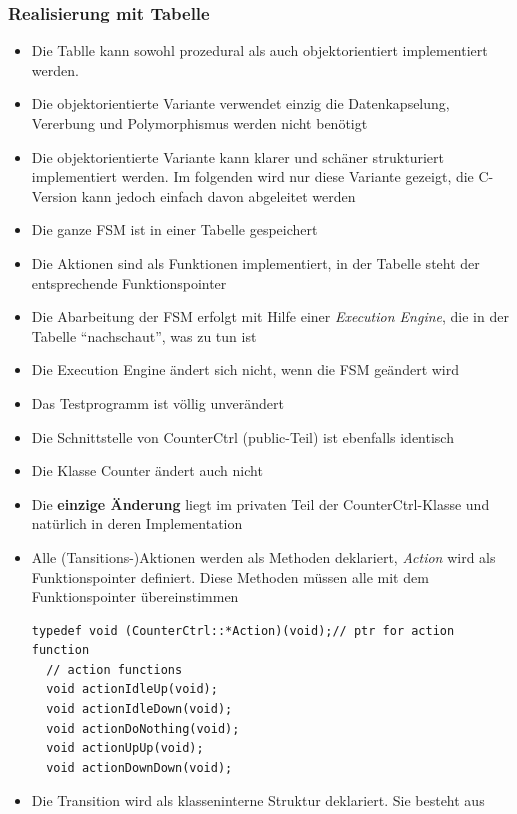 \subsubsection{Realisierung mit Tabelle}
\begin{itemize}
  \item Die Tablle kann sowohl prozedural als auch objektorientiert implementiert werden.
  \item Die objektorientierte Variante verwendet einzig die Datenkapselung,
        Vererbung und Polymorphismus werden nicht benötigt
  \item Die objektorientierte Variante kann klarer und schäner strukturiert
        implementiert werden. Im folgenden wird nur diese Variante gezeigt, die
        C-Version kann jedoch einfach davon abgeleitet werden
  \item Die ganze FSM ist in einer Tabelle gespeichert
  \item Die Aktionen sind als Funktionen implementiert, in der Tabelle steht der
        entsprechende Funktionspointer
  \item Die Abarbeitung der FSM erfolgt mit Hilfe einer \textit{Execution
        Engine}, die in der Tabelle "`nachschaut"', was zu tun ist
  \item Die Execution Engine ändert sich nicht, wenn die FSM geändert wird
  \item Das Testprogramm ist völlig unverändert
  \item Die Schnittstelle von CounterCtrl (public-Teil) ist ebenfalls identisch
  \item Die Klasse Counter ändert auch nicht
  \item Die \textbf{einzige Änderung} liegt im privaten Teil der
        CounterCtrl-Klasse und natürlich in deren Implementation
  \item Alle (Tansitions-)Aktionen werden als Methoden deklariert,
  \textit{Action} wird als Funktionspointer definiert. Diese Methoden müssen
  alle mit dem Funktionspointer übereinstimmen
 \begin{lstlisting}[style=Cpp]
 typedef void (CounterCtrl::*Action)(void);// ptr for action function
  // action functions 
  void actionIdleUp(void); 
  void actionIdleDown(void); 
  void actionDoNothing(void); 
  void actionUpUp(void); 
  void actionDownDown(void);
 \end{lstlisting}
 \item Die Transition wird als klasseninterne Struktur deklariert. Sie besteht
 aus
 \begin{itemize}

\end{itemize}
\end{itemize}
